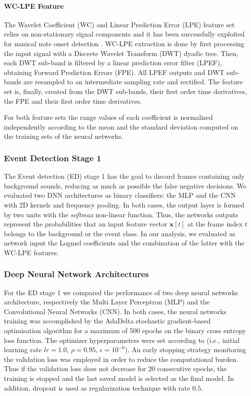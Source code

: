 \paragraph{WC-LPE Feature}
The Wavelet Coefficient (WC) and Linear Prediction Error (LPE) feature set relies on non-stationary signal components and it has been successfully exploited for musical note onset detection \cite{marchi2014multi}. WC-LPE extraction is done by first processing the input signal with a Discrete Wavelet Transform (DWT) dyadic tree. Then, each DWT sub-band is filtered by a linear prediction error filter (LPEF), obtaining Forward Prediction Errors (FPE). All LPEF outputs and DWT sub-bands are resampled to an intermediate sampling rate and rectified. The feature set is, finally, created from the DWT sub-bands, their first order time derivatives, the FPE and their first order time derivatives.

For both feature sets the range values of each coefficient is normalized independently according to the mean and the standard deviation computed on the training sets of the neural networks.

\subsubsection{Event Detection Stage 1}
The Event detection (ED) stage 1 has the goal to discard frames containing only background sounds, reducing as much as possible the false negative decisions.
We evaluated two DNN architectures as binary classifiers: the MLP and the CNN with 2D kernels and frequency pooling. In both cases, the output layer is formed by two units with the \textit{softmax} non-linear function. Thus, the networks outputs represent the probabilities that an input feature vector $\mathbf{x}[t]$ at the frame index $t$ belongs to the background or the event class. In our analysis, we evaluated as network input the Logmel coefficients and the combination of the latter with the WC-LPE features.

\subsubsection{Deep Neural Network Architectures}
For the ED stage 1 we compared the performance of two deep neural networks architecture, respectively the Multi Layer Perceptron (MLP) and the Convolutional Neural Networks (CNN). In both cases, the neural networks training was accomplished by the AdaDelta stochastic gradient-based optimisation algorithm \cite{zeiler2012adadelta} for a maximum of 500 epochs on the binary cross entropy loss function. The optimizer hyperparameters were set according to \cite{zeiler2012adadelta} (i.e., initial learning rate $lr=1.0$, $\rho=0.95$, $\epsilon=10^{-6}$). An early stopping strategy monitoring the validation loss was employed in order to reduce the computational burden. Thus if the validation loss does not decrease for 20 consecutive epochs, the training is stopped and the last saved model is selected as the final model. In addition, dropout is used as regularization technique \cite{srivastava2014dropout} with rate $0.5$. 

